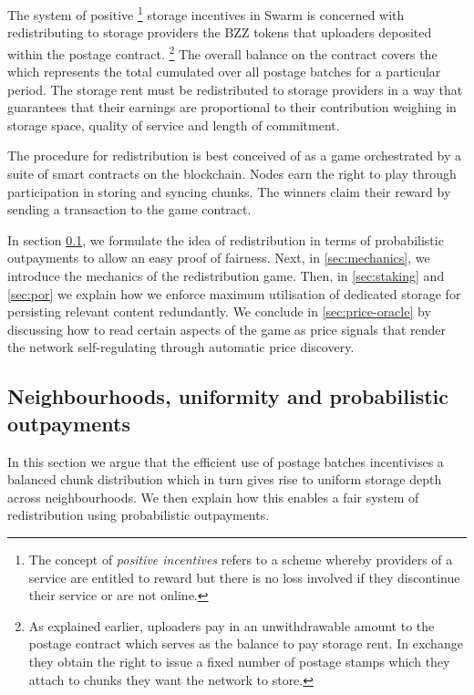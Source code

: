 The system of positive%
%
\footnote{The concept of \emph{positive incentives} refers to a scheme whereby providers of a service are entitled to reward but there is no loss involved if they discontinue their service or are not online.}
%
storage incentives in Swarm is concerned with redistributing  to storage providers the BZZ tokens that uploaders deposited within the postage contract.%
%
\footnote{As explained earlier, uploaders pay in an unwithdrawable amount to the postage contract which serves as the balance to pay storage rent. In exchange they obtain the right to issue a fixed number of postage stamps which they attach to chunks they want the network to store.}
%
The overall balance on the contract covers the  which represents the total  cumulated over all postage batches for a particular period. The storage rent must be redistributed to storage providers in a way that guarantees that their earnings are proportional to their contribution weighing in storage space, quality of service and length of commitment.

The procedure for redistribution is best conceived of as a game orchestrated by a suite of smart contracts on the blockchain. Nodes earn the right to play through participation in storing and syncing chunks. 
The winners claim their reward by sending a transaction to the game contract. 

In section \ref{sec:uniformity-pot}, we formulate the idea of redistribution in terms of probabilistic outpayments to allow an easy proof of fairness. Next, in \ref{sec:mechanics}, we introduce the mechanics of the redistribution game.
Then, in \ref{sec:staking} and \ref{sec:por} we explain how we enforce maximum utilisation of dedicated storage for persisting  relevant content redundantly. We conclude in \ref{sec:price-oracle} by discussing how to read certain aspects of the game as price signals that render the network self-regulating through automatic price discovery. 

\subsection{Neighbourhoods, uniformity and probabilistic outpayments}\label{sec:uniformity-pot} 

In this section we argue that the efficient use of postage batches incentivises a balanced chunk distribution which in turn gives rise to uniform storage depth across neighbourhoods. We then explain how this enables a fair system of redistribution using probabilistic outpayments.


